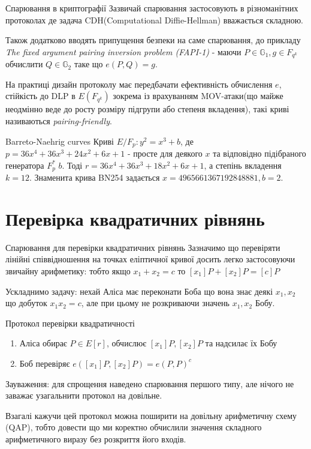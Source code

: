 \documentclass[9pt]{beamer}
\begin{document}
\begin{darkframes}
\begin{frame}{Спарювання в криптографії}
    Зазвичай спарювання застосовують в різноманітних протоколах де задача CDH(Computational Diffie-Hellman) вважається складною. 
    
    Також додатково вводять припущення безпеки на саме спарювання, до прикладу \textit{The fixed argument pairing inversion problem (FAPI-1)} - маючи $P \in \mathbb{G}_1,g \in F_{q^k}$ обчислити $Q \in \mathbb{G}_2$ таке що $e(P,Q)=g$.

    На практиці дизайн протоколу має передбачати ефективність обчислення $e$, стійкість до DLP в $E(F_{q^k})$ зокрема із врахуванням MOV-атаки(що майже неодмінно веде до росту розміру підгрупи або степеня вкладення), такі криві називаються \textit{pairing-friendly}.
    \begin{block}{Barreto-Naehrig curves}
        Криві $E/F_p:y^2=x^3+b$, де $p=36x^4+36x^3+24x^2+6x+1$ - просте для деякого $x$ та відповідно підібраного генератора $F_p^*$ $b$. Тоді $r=36x^4+36x^3+18x^2+6x+1$, а степінь вкладення $k=12$. Знаменита крива BN254 задається $x=4965661367192848881, b=2$.
    \end{block}
\end{frame}
\section{Перевірка квадратичних рівнянь}
\begin{frame}{Спарювання для перевірки квадратичних рівнянь}
  Зазначимо що перевіряти лінійні співвідношення на точках еліптичної кривої досить легко застосовуючи звичайну арифметику: тобто якщо $x_1+x_2=c$ то $[x_1]P+[x_2]P=[c]P$
  
  Ускладнимо задачу: нехай Аліса має переконати Боба що вона знає деякі $x_1,x_2$ що добуток $x_1x_2 = c$, але при цьому не розкриваючи значень $x_1,x_2$ Бобу. 
  \begin{block}{Протокол перевірки квадратичності}
      \begin{enumerate}
          \item Аліса обирає $P \in E[r]$, обчислює $[x_1]P, [x_2]P$ та надсилає їх Бобу
          \item Боб перевіряє $e([x_1]P, [x_2]P)=e(P,P)^c$
      \end{enumerate}
    Зауваження: для спрощення наведено спарювання першого типу, але нічого не заважає узагальнити протокол на довільне.
  \end{block}

  Взагалі кажучи цей протокол можна поширити на довільну арифметичну схему (QAP), тобто довести що ми коректно обчислили значення складного арифметичного виразу без розкриття його входів.
\end{frame}


\end{darkframes}
\end{document}
